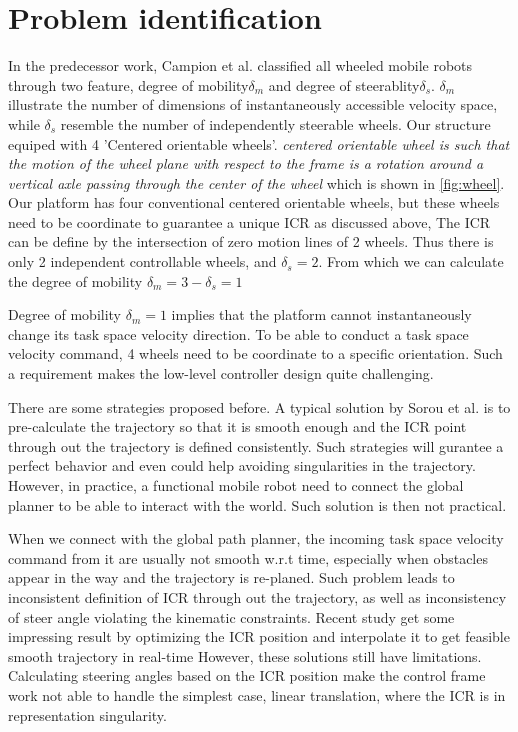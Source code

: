 \section{Problem identification}
\label{sec:problemIdentification}
In the predecessor work, Campion et al.\cite{campion1996structural} classified all wheeled mobile robots through two feature, degree of mobility$\delta_m$ and degree of steerablity$\delta_s$. $\delta_m$ illustrate the number of dimensions of instantaneously accessible velocity space, while $\delta_s$ resemble the number of independently steerable wheels. Our structure equiped with 4 'Centered orientable wheels'. \textit{centered orientable wheel is such that the motion of the wheel plane with respect to the frame is a rotation around a vertical axle passing through the center of the wheel}\cite{campion1996structural} which is shown in \cref{fig:wheel}. Our platform has four conventional centered orientable wheels, but these wheels need to be coordinate to guarantee a unique ICR as discussed above, The ICR can be define by the intersection of zero motion lines of 2 wheels. Thus there is only 2 independent controllable wheels, and $\delta_s = 2$. From which we can calculate the degree of mobility $\delta_m = 3 - \delta_s = 1$ 

Degree of mobility $\delta_m = 1$ implies that the platform cannot instantaneously change its task space velocity direction. To be able to conduct a task space velocity command, 4 wheels need to be coordinate to a specific
orientation. Such a requirement makes the low-level controller design quite challenging.

There are some strategies proposed before. A typical solution by Sorou et al. \cite{sorour2016kinematic} is to pre-calculate the trajectory so that it is smooth enough and the ICR point through out the trajectory is defined consistently. Such strategies will gurantee a perfect behavior and even could help avoiding singularities in the trajectory. However, in practice, a functional mobile robot need to connect the global planner to be able to interact with the world. Such solution is then not practical. 

When we connect with the global path planner, the incoming task space velocity command from it are usually not smooth w.r.t time, especially when obstacles appear in the way and the trajectory is re-planed. Such problem leads to inconsistent definition of ICR through out the trajectory, as well as inconsistency of steer angle violating the kinematic constraints. Recent study get some  impressing  result by optimizing the ICR position and interpolate it to get feasible smooth trajectory in real-time \cite{sorour2016motion}
However, these solutions still have limitations. Calculating steering angles based on the ICR position make the control frame work not able to handle the simplest case, linear translation, where the ICR is in representation singularity.

